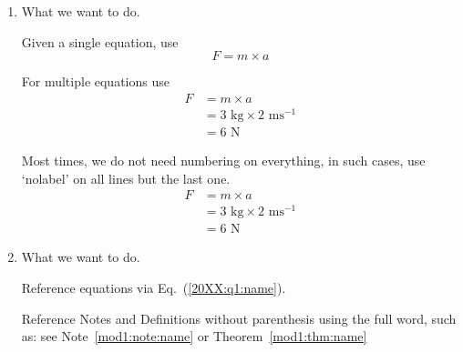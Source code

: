 \begin{enumerate}[label = \bfseries (\alph*)]

\item What we want to do.

Given a single equation, use
\begin{equation} \label{20XX:q1:name}
	F = m \times a
\end{equation}

For multiple equations use
\begin{align}
	F &= m \times a \\
	  &= 3\text{ kg} \times 2 \text{ ms}^{-1} \\
	  &= 6 \text{ N}
\end{align}

Most times, we do not need numbering on everything, in such
cases, use `nolabel' on all lines but the last one.
\begin{align}
	F &= m \times a \nonumber \\
	  &= 3\text{ kg} \times 2 \text{ ms}^{-1} \nonumber \\
	  &= 6 \text{ N}
\end{align}

\item What we want to do.

Reference equations via Eq.~(\ref{20XX:q1:name}).

Reference Notes and Definitions without parenthesis using the full word,
such as: see Note~\ref{mod1:note:name} or Theorem~\ref{mod1:thm:name}

\end{enumerate}

